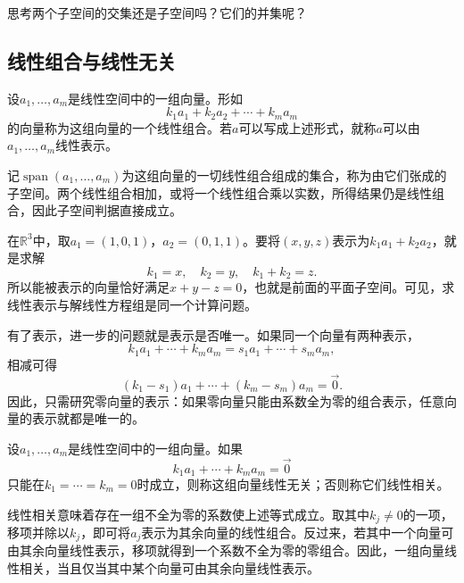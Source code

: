 {\kaiti{}思考\quad 两个子空间的交集还是子空间吗？它们的并集呢？}

\subsection{线性组合与线性无关}
设\(a_{1} , \ldots , a_{m}\)是线性空间中的一组向量。形如
\begin{equation}
    k_{1} a_{1} + k_{2} a_{2} + \cdots + k_{m} a_{m}
\end{equation}
的向量称为这组向量的一个{\heiti{}线性组合}。若\(a\)可以写成上述形式，就称\(a\)可以由\(a_{1} , \ldots , a_{m}\)线性表示。

记\(\operatorname{span}\left( a_{1} , \ldots , a_{m} \right)\)为这组向量的一切线性组合组成的集合，称为由它们{\heiti{}张成的子空间}。两个线性组合相加，或将一个线性组合乘以实数，所得结果仍是线性组合，因此子空间判据直接成立。

在\(\mathbb{R}^{3}\)中，取\(a_{1} = \left( 1 , 0 , 1 \right)\)，\(a_{2} = \left( 0 , 1 , 1 \right)\)。要将\(\left( x , y , z \right)\)表示为\(k_{1} a_{1} + k_{2} a_{2}\)，就是求解
\begin{equation}
    k_{1} = x , \quad k_{2} = y , \quad k_{1} + k_{2} = z .
\end{equation}
所以能被表示的向量恰好满足\(x + y - z = 0\)，也就是前面的平面子空间。可见，求线性表示与解线性方程组是同一个计算问题。

有了表示，进一步的问题就是表示是否唯一。如果同一个向量有两种表示，
\begin{equation}
    k_{1} a_{1} + \cdots + k_{m} a_{m} = s_{1} a_{1} + \cdots + s_{m} a_{m} ,
\end{equation}
相减可得
\begin{equation}
    \left( k_{1} - s_{1} \right) a_{1} + \cdots + \left( k_{m} - s_{m} \right) a_{m} = \vec{0} .
\end{equation}
因此，只需研究零向量的表示：如果零向量只能由系数全为零的组合表示，任意向量的表示就都是唯一的。

\begin{definition}\label{def:linindep}
设\(a_{1} , \ldots , a_{m}\)是线性空间中的一组向量。如果
\begin{equation}
    k_{1} a_{1} + \cdots + k_{m} a_{m} = \vec{0}
\end{equation}
只能在\(k_{1} = \cdots = k_{m} = 0\)时成立，则称这组向量线性无关；否则称它们线性相关。
\end{definition}

线性相关意味着存在一组不全为零的系数使上述等式成立。取其中\(k_{j} \ne 0\)的一项，移项并除以\(k_{j}\)，即可将\(a_{j}\)表示为其余向量的线性组合。反过来，若其中一个向量可由其余向量线性表示，移项就得到一个系数不全为零的零组合。因此，一组向量线性相关，当且仅当其中某个向量可由其余向量线性表示。

